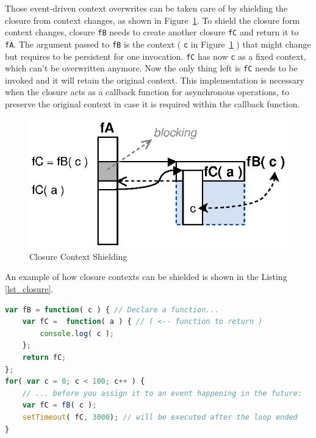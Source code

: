 Those event-driven context overwrites can be taken care of by shielding the closure from context changes, as shown in Figure~\ref{fig:Closures_Closure-3}.
To shield the closure form context changes, closure \texttt{fB} needs to create another closure \texttt{fC} and return it to \texttt{fA}.
The argument passed to \texttt{fB} is the context ( \texttt{c} in Figure~\ref{fig:Closures_Closure-3} ) that might change but requires to be persistent for one invocation.
\texttt{fC} has now \texttt{c} as a fixed context, which can't be overwritten anymore.
Now the only thing left is \texttt{fC} needs to be invoked and it will retain the original context.
This implementation is necessary when the closure acts as a callback function for asynchronous operations, to preserve the original context in case it is required within the callback function.
\begin{figure}[!ht]
	\centering
  \includegraphics{figures/Closures_Closure-3}
	\caption{Closure Context Shielding}
	\label{fig:Closures_Closure-3}
\end{figure}


An example of how closure contexts can be shielded is shown in the Listing \ref{lst_closure}.
\begin{lstlisting}[float=h,label=lst_closure,language=JavaScript,caption=JavaScript Closure Context Shielding]
var fB = function( c ) { // Declare a function...
	var fC =  function( a ) { // ( <-- function to return )
		console.log( c );
	};
	return fC;
};
for( var c = 0; c < 100; c++ ) {
	// ... before you assign it to an event happening in the future:
	var fC = fB( c );
	setTimeout( fC, 3000); // will be executed after the loop ended
}
\end{lstlisting}



